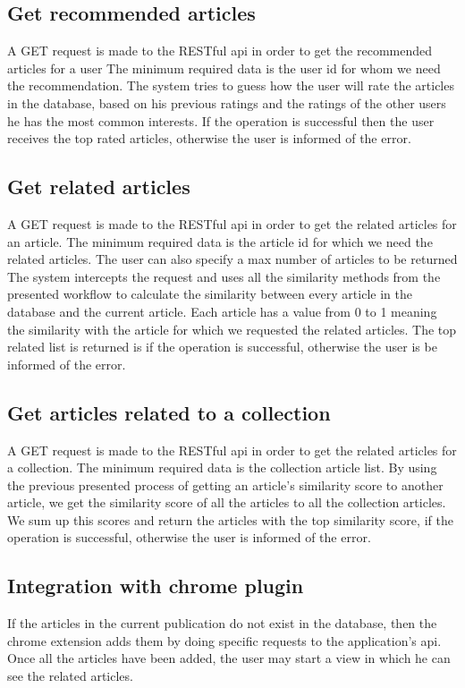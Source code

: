 \subsection{Get recommended articles}
\label{sec:workflow-get-recommended-articles}
A GET request is made to the RESTful api in order to get the recommended articles for a user
The minimum required data is the user id for whom we need the recommendation.
The system tries to guess how the user will rate the articles in the database, based on his previous ratings and the ratings of the other users he has the most common interests.
If the operation is successful then the user receives the top rated articles, otherwise the user is informed of the error.

\subsection{Get related articles}
\label{sec:workflow-get-related-articles}
A GET request is made to the RESTful api in order to get the related articles for an article.
The minimum required data is the article id for which we need the related articles. The user can also specify a max number of articles to be returned
The system intercepts the request and uses all the similarity methods from the presented workflow to calculate the similarity between every article in the database and the current article.
Each article has a value from 0 to 1 meaning the similarity with the article for which we requested the related articles.
The top related list is returned is if the operation is successful, otherwise the user is be informed of the error.


\subsection{Get articles related to a collection}
\label{sec:workflow-get-articles-related-to-collection}
A GET request is made to the RESTful api in order to get the related articles for  a collection.
The minimum required data is the collection article list.
By using the previous presented process of getting an article’s similarity score to another article, we get the similarity score of all the articles to all the collection articles. We sum up this scores and return the articles with the top similarity score, if the operation is successful, otherwise the user is informed of the error.

\subsection{Integration with chrome plugin}
\label{sec:workflow-integration-with-chrome-plugin}
If the articles in the current publication do not exist in the database, then the chrome extension adds them by doing specific requests to the application's api.
Once all the articles have been added, the user may start a view in which he can see the related articles.